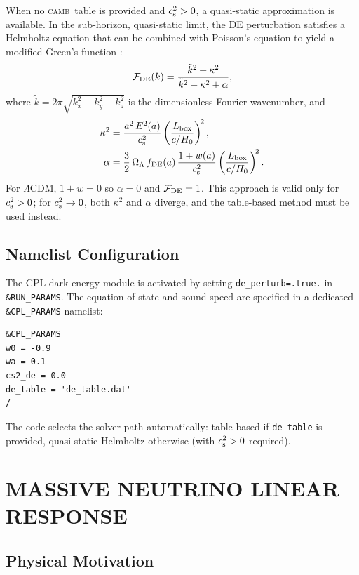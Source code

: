 \documentclass[fleqn,usenatbib]{mnras}
\newcommand{\camb}{\textsc{camb}}
\newcommand{\code}[1]{\texttt{#1}}
\newcommand{\Ol}{\Omega_\Lambda}
\newcommand{\cst}{c_{\rm s}^2}
\begin{document}
When no \camb\ table is provided and $\cst > 0$, a quasi-static
approximation is available.  In the sub-horizon, quasi-static limit,
the DE perturbation satisfies a Helmholtz equation that can be
combined with Poisson's equation to yield a modified Green's function
\citep{Bean2004,Sapone2010}:
\begin{equation}
\mathcal{F}_{\rm DE}(k)
  = \frac{\tilde{k}^2 + \kappa^2}
         {\tilde{k}^2 + \kappa^2 + \alpha},
\label{eq:helmholtz_factor}
\end{equation}
where $\tilde{k} = 2\pi\sqrt{k_x^2+k_y^2+k_z^2}$ is the
dimensionless Fourier wavenumber, and
\begin{align}
\kappa^2 &= \frac{a^2\,E^2(a)}{c_{\rm s}^2}
  \left(\frac{L_{\rm box}}{c/H_0}\right)^{\!2},
\label{eq:kappa2}\\
\alpha &= \frac{3}{2}\,\Ol\,f_{\rm DE}(a)\,
  \frac{1+w(a)}{c_{\rm s}^2}
  \left(\frac{L_{\rm box}}{c/H_0}\right)^{\!2}.
\label{eq:alpha}
\end{align}
For $\Lambda$CDM, $1+w=0$ so $\alpha=0$ and $\mathcal{F}_{\rm DE}=1$.
This approach is valid only for $\cst > 0$; for $\cst \to 0$, both
$\kappa^2$ and $\alpha$ diverge, and the table-based method must be
used instead.

\subsection{Namelist Configuration}
\label{sec:de_namelist}

The CPL dark energy module is activated by setting \code{de\_perturb=.true.}
in \code{\&RUN\_PARAMS}.  The equation of state and sound speed are
specified in a dedicated \code{\&CPL\_PARAMS} namelist:
\begin{verbatim}
&CPL_PARAMS
w0 = -0.9
wa = 0.1
cs2_de = 0.0
de_table = 'de_table.dat'
/
\end{verbatim}
The code selects the solver path automatically: table-based if
\code{de\_table} is provided, quasi-static Helmholtz otherwise
(with $\cst > 0$ required).


\section{MASSIVE NEUTRINO LINEAR RESPONSE}
\label{sec:neutrino}

\subsection{Physical Motivation}
\label{sec:nu_motivation}
\end{document}
